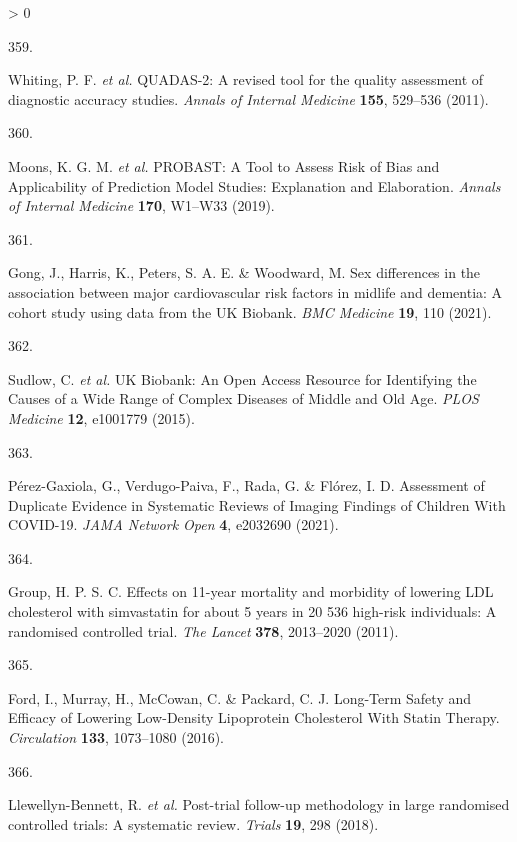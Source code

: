 \documentclass[a4paper, twoside]{templates/ociamthesis}
\newlength{\cslhangindent}
\newlength{\csllabelwidth}
\newenvironment{CSLReferences}[3] %
 {%
  \setlength{\parindent}{0pt}
  \ifodd #1 \everypar{\setlength{\hangindent}{\cslhangindent}}\ignorespaces\fi
  \ifnum #2 > 0
  \setlength{\parskip}{#2\baselineskip}
  \fi
 }%
 {}
\newcommand{\CSLLeftMargin}[1]{\parbox[t]{\maxof{\widthof{#1}}{\csllabelwidth}}{#1}}
\newcommand{\CSLRightInline}[1]{\parbox[t]{\linewidth - \csllabelwidth}{#1}}
\begin{document}
\begin{CSLReferences}{0}{0}
\leavevmode\hypertarget{ref-whiting2011}{}%
\CSLLeftMargin{359. }
\CSLRightInline{Whiting, P. F. \emph{et al.} {QUADAS}-2: A revised tool for the quality assessment of diagnostic accuracy studies. \emph{Annals of Internal Medicine} \textbf{155}, 529--536 (2011).}

\leavevmode\hypertarget{ref-moons2019}{}%
\CSLLeftMargin{360. }
\CSLRightInline{Moons, K. G. M. \emph{et al.} {PROBAST}: A {Tool} to {Assess Risk} of {Bias} and {Applicability} of {Prediction Model Studies}: Explanation and {Elaboration}. \emph{Annals of Internal Medicine} \textbf{170}, W1--W33 (2019).}

\leavevmode\hypertarget{ref-gong2021}{}%
\CSLLeftMargin{361. }
\CSLRightInline{Gong, J., Harris, K., Peters, S. A. E. \& Woodward, M. Sex differences in the association between major cardiovascular risk factors in midlife and dementia: A cohort study using data from the {UK Biobank}. \emph{BMC Medicine} \textbf{19}, 110 (2021).}

\leavevmode\hypertarget{ref-sudlow2015}{}%
\CSLLeftMargin{362. }
\CSLRightInline{Sudlow, C. \emph{et al.} {UK Biobank}: An {Open Access Resource} for {Identifying} the {Causes} of a {Wide Range} of {Complex Diseases} of {Middle} and {Old Age}. \emph{PLOS Medicine} \textbf{12}, e1001779 (2015).}

\leavevmode\hypertarget{ref-perez-gaxiola2021}{}%
\CSLLeftMargin{363. }
\CSLRightInline{Pérez-Gaxiola, G., Verdugo-Paiva, F., Rada, G. \& Flórez, I. D. Assessment of {Duplicate Evidence} in {Systematic Reviews} of {Imaging Findings} of {Children With COVID}-19. \emph{JAMA Network Open} \textbf{4}, e2032690 (2021).}

\leavevmode\hypertarget{ref-group2011}{}%
\CSLLeftMargin{364. }
\CSLRightInline{Group, H. P. S. C. Effects on 11-year mortality and morbidity of lowering {LDL} cholesterol with simvastatin for about 5 years in 20 536 high-risk individuals: A randomised controlled trial. \emph{The Lancet} \textbf{378}, 2013--2020 (2011).}

\leavevmode\hypertarget{ref-ford2016}{}%
\CSLLeftMargin{365. }
\CSLRightInline{Ford, I., Murray, H., McCowan, C. \& Packard, C. J. Long-{Term Safety} and {Efficacy} of {Lowering Low}-{Density Lipoprotein Cholesterol With Statin Therapy}. \emph{Circulation} \textbf{133}, 1073--1080 (2016).}

\leavevmode\hypertarget{ref-llewellyn-bennett2018}{}%
\CSLLeftMargin{366. }
\CSLRightInline{Llewellyn-Bennett, R. \emph{et al.} Post-trial follow-up methodology in large randomised controlled trials: A systematic review. \emph{Trials} \textbf{19}, 298 (2018).}


\end{CSLReferences}
\end{document}
